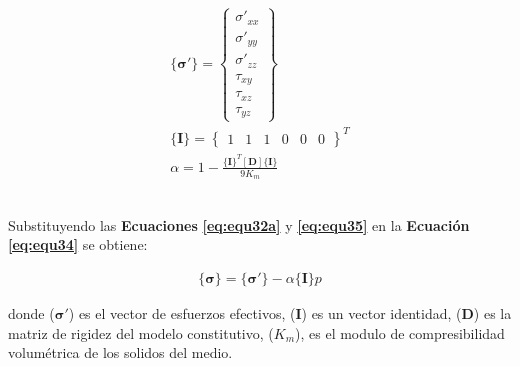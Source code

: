 \begin{ceqn} 
\begin{subequations} \label{eq:equ35} 
\begin{gather}
\{\mathbf{\sigma'}\} = 
       \begin{Bmatrix} 
       \sigma'_{xx}\\[3pt]
       \sigma'_{yy}\\[3pt]
       \sigma'_{zz}\\[3pt]
       \tau_{xy}\\[3pt]
       \tau_{xz}\\[3pt]
       \tau_{yz}
       \end{Bmatrix} 
       \label{eq:equ35a} \\[5pt]
\{\mathbf{I}\} = 
      \begin{Bmatrix}
       1 & 1 & 1 & 0 & 0 & 0
       \end{Bmatrix} ^T
       \label{eq:equ35b} \\[10pt]
\alpha = 
       1 - \frac{\{\mathbf{I}\}^T[\mathbf{D}]\{\mathbf{I}\}}{9K_m}
       \label{eq:equ35c}
\end{gather}  
\end{subequations} 
\end{ceqn}
\\
Substituyendo las \textbf{Ecuaciones} \textbf{\ref{eq:equ32a}} y \textbf{\ref{eq:equ35}} en la \textbf{Ecuación} \textbf{\ref{eq:equ34}} se obtiene:

\begin{ceqn} 
\label{eq:equ36} 
\begin{gather}
\{\mathbf{\sigma}\} = \{\mathbf{\sigma'}\} - \alpha\{\mathbf{I}\} p 
\end{gather}  
\end{ceqn}
donde ($\mathbf{\sigma'}$) es el vector de esfuerzos efectivos, ($\mathbf{I}$) es un vector identidad, ($\mathbf{D}$) es la matriz de rigidez del modelo constitutivo, ($K_{m}$), es el modulo de compresibilidad volumétrica de los solidos del medio. \bigskip %


